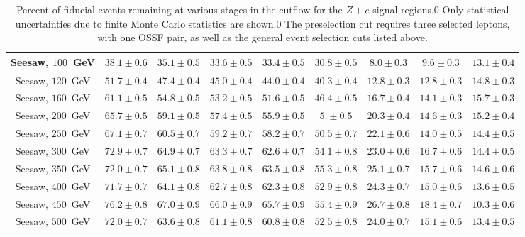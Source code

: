\begin{table}[ht]
{\begin{tabular}{|c|c|c|c|c|c||c|c|c|}
		\hline
		Seesaw, $100$~GeV	&	$38.1 \pm 0.6$	&	$35.1 \pm 0.5$	&	$33.6 \pm 0.5$	&	$33.4 \pm 0.5$	&	$30.8 \pm 0.5$	&	$8.0 \pm 0.3$ &	$9.6 \pm 0.3$	&	$13.1 \pm 0.4$	\\
		\hline
		Seesaw, $120$~GeV	&	$51.7 \pm 0.4$	&	$47.4 \pm 0.4$	&	$45.0 \pm 0.4$	&	$44.0 \pm 0.4$	&	$40.3 \pm 0.4$	&	$12.8 \pm 0.3$ &	$12.8 \pm 0.3$	&	$14.8 \pm 0.3$	\\
		\hline
		Seesaw, $160$~GeV	&	$61.1 \pm 0.5$	&	$54.8 \pm 0.5$	&	$53.2 \pm 0.5$	&	$51.6 \pm 0.5$	&	$46.4 \pm 0.5$	&	$16.7 \pm 0.4$ &	$14.1 \pm 0.3$	&	$15.7 \pm 0.3$	\\
		\hline
		Seesaw, $200$~GeV	&	$65.7 \pm 0.5$	&	$59.1 \pm 0.5$	&	$57.4 \pm 0.5$	&	$55.9 \pm 0.5$	&	$5 .\pm 0.5$		&	$20.3 \pm 0.4$ &	$14.6 \pm 0.3$	&	$15.2 \pm 0.4$	\\
		\hline
		Seesaw, $250$~GeV	&	$67.1 \pm 0.7$	&	$60.5 \pm 0.7$	&	$59.2 \pm 0.7$	&	$58.2 \pm 0.7$	&	$50.5 \pm 0.7$	&	$22.1 \pm 0.6$ &	$14.0 \pm 0.5$	&	$14.4 \pm 0.5$	\\
		\hline
		Seesaw, $300$~GeV	&	$72.9 \pm 0.7$	&	$64.9 \pm 0.7$	&	$63.3 \pm 0.7$	&	$62.6 \pm 0.7$	&	$54.1 \pm 0.8$	&	$23.0 \pm 0.6$ &	$16.7 \pm 0.6$	&	$14.4 \pm 0.5$	\\
		\hline
		Seesaw, $350$~GeV	&	$72.0 \pm 0.7$	&	$65.1 \pm 0.8$	&	$63.8 \pm 0.8$	&	$63.5 \pm 0.8$	&	$55.3 \pm 0.8$	&	$25.1 \pm 0.7$ &	$15.7 \pm 0.6$	&	$14.6 \pm 0.6$	\\
		\hline
		Seesaw, $400$~GeV	&	$71.7 \pm 0.7$	&	$64.1 \pm 0.8$	&	$62.7 \pm 0.8$	&	$62.3 \pm 0.8$	&	$52.9 \pm 0.8$	&	$24.3 \pm 0.7$ &	$15.0 \pm 0.6$	&	$13.6 \pm 0.5$	\\
		\hline
		Seesaw, $450$~GeV	&	$76.2 \pm 0.8$	&	$67.0 \pm 0.9$	&	$66.0 \pm 0.9$	&	$65.7 \pm 0.9$	&	$55.4 \pm 0.9$	&	$26.7 \pm 0.8$ &	$18.4 \pm 0.7$	&	$10.3 \pm 0.6$	\\
		\hline
		Seesaw, $500$~GeV	&	$72.0 \pm 0.7$	&	$63.6 \pm 0.8$	&	$61.1 \pm 0.8$	&	$60.8 \pm 0.8$	&	$52.5 \pm 0.8$	&	$24.0 \pm 0.7$ &	$15.1 \pm 0.6$	&	$13.4 \pm 0.5$	\\
		\hline
	\end{tabular}
	}
	\caption{Percent of fiducial events remaining at various stages in the cutflow for the $Z+e$ signal regions.0 Only statistical uncertainties due to finite Monte Carlo statistics are shown.0 The preselection cut requires three selected leptons, with one OSSF pair, as well as the general event selection cuts listed above.}
	\label{table:fiducial-efficiencies-Ze}
\end{table}

